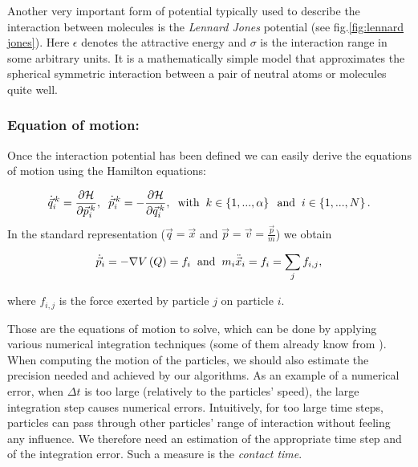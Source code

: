 Another very important form of potential typically used to describe the interaction between molecules is the \emph{Lennard Jones} potential (see fig.\ref{fig:lennard jones}). Here $\epsilon$ denotes the attractive energy and $\sigma$ is the interaction range in some arbitrary units. It is a mathematically simple model that approximates the spherical symmetric interaction between a pair of neutral atoms or molecules quite well.


\subsubsection*{Equation of motion:}
Once the interaction potential has been defined we can easily derive the equations of motion using the Hamilton equations:

$$
\dot{\vec{q}}_i^{\,k} =  \frac{\partial \mathcal{H}}{\partial \vec{p}_i^{\,k}},
\hspace{0.2cm}
\dot{ \vec{p}}_i^{\,k} = - \frac{\partial \mathcal{H}}{\partial \vec{q}_i^{\,k}},
\hspace{0.2cm} \text{with} \hspace{0.2cm}
k\in\left\{1,...,\alpha\right\}
\hspace{0.2cm} \text{and} \hspace{0.2cm}
i\in\left\{1,...,N\right\}.
$$
In the standard representation ($\vec{q}=\vec{x}$ and $\vec{p}=\vec{v}=\frac{\vec{p}}{m}$) we obtain 

\begin{equation}
\dot{\vec{p}}_i = - \nabla V\left(Q\right) =f_i
\hspace{0.2cm} \text{and} \hspace{0.2cm}
m_i \ddot{\vec{x}}_i = f_i = \sum_j {f_{i,j}},
\label{newt_MD_eq}
\end{equation}

where ${f_{i,j}}$ is the force exerted by particle $j$ on particle $i$.

Those are the equations of motion to solve, which can be done by applying various numerical integration techniques (some of them already know from \citet{comp_phys}). When computing the motion of the particles, we should also estimate the precision needed and achieved by our algorithms. As an example of a numerical error, when $\Delta t$ is too large (relatively to the particles' speed), the large integration step causes numerical errors. Intuitively, for too large time steps, particles can pass through other particles' range of interaction without feeling any influence. We therefore need an estimation of the appropriate time step and of the integration error. Such a measure is the \textit{contact time}.

